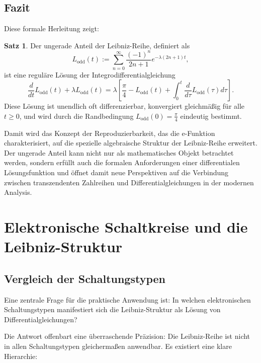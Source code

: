\documentclass[a4paper,12pt,twoside]{report}
\theoremstyle{definition}
\newtheorem{satz}{Satz}
\begin{document}
\subsection{Fazit}

Diese formale Herleitung zeigt:

\begin{satz}
	Der ungerade Anteil der Leibniz-Reihe, definiert als
	$$L_{\text{odd}}(t) := \sum_{n=0}^{\infty} \frac{(-1)^n}{2n+1} e^{-\lambda(2n+1)t},$$
	ist eine reguläre Lösung der Integrodifferentialgleichung
	$$\frac{d}{dt} L_{\text{odd}}(t) + \lambda L_{\text{odd}}(t) = \lambda \left[ \frac{\pi}{4} - L_{\text{odd}}(t) + \int_0^t \frac{d}{d\tau} L_{\text{odd}}(\tau) d\tau \right].$$
	Diese Lösung ist unendlich oft differenzierbar, konvergiert gleichmäßig für alle $t \geq 0$, und wird durch die Randbedingung $L_{\text{odd}}(0) = \frac{\pi}{4}$ eindeutig bestimmt.
\end{satz}

Damit wird das Konzept der Reproduzierbarkeit, das die e-Funktion charakterisiert, auf die spezielle algebraische Struktur der Leibniz-Reihe erweitert. Der ungerade Anteil kann nicht nur als mathematisches Objekt betrachtet werden, sondern erfüllt auch die formalen Anforderungen einer differentialen Lösungsfunktion und öffnet damit neue Perspektiven auf die Verbindung zwischen transzendenten Zahlreihen und Differentialgleichungen in der modernen Analysis.

\section{Elektronische Schaltkreise und die Leibniz-Struktur}

\subsection{Vergleich der Schaltungstypen}

Eine zentrale Frage für die praktische Anwendung ist: In welchen elektronischen Schaltungstypen manifestiert sich die Leibniz-Struktur als Lösung von Differentialgleichungen? 

Die Antwort offenbart eine überraschende Präzision: Die Leibniz-Reihe ist nicht in allen Schaltungstypen gleichermaßen anwendbar. Es existiert eine klare Hierarchie:
\end{document}
